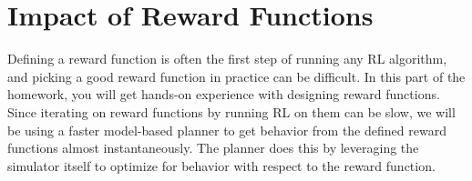 \section{Impact of Reward Functions}

Defining a reward function is often the first step of running any RL algorithm, and picking a good reward function in practice can be difficult. 
In this part of the homework, you will get hands-on experience with designing reward functions. 
Since iterating on reward functions by running RL on them can be slow, we will be using a faster model-based planner to get behavior from the defined 
reward functions almost instantaneously. The planner does this by leveraging the simulator itself to optimize for behavior with respect to the reward function.


\begin{enumerate}[(a)]

  

  

\end{enumerate}



